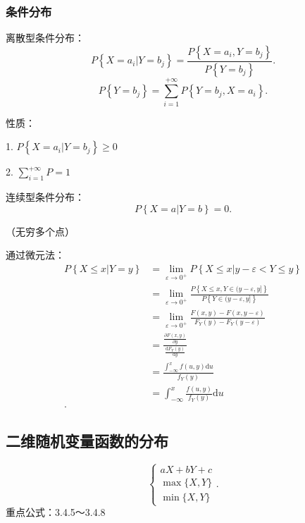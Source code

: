 \subsubsection{条件分布}%
\label{subsub:条件分布}
\begin{notation}
    离散型条件分布：
    \[
        P\left\{ X=a_i|Y=b_j \right\} =\frac{P\left\{ X=a_i,Y=b_j \right\} }{P\left\{ Y=b_j \right\} }
    .\] 
    \[
        P\left\{ Y=b_j \right\} =\sum_{i=1}^{+\infty} P\left\{ Y=b_j,X=a_i \right\} 
    .\] 

    性质：

    1. $P\left\{ X=a_i|Y=b_j \right\} \ge 0$

    2. $\displaystyle{\sum_{i=1}^{+\infty} P=1}$
\end{notation}
\begin{notation}
    连续型条件分布：
    \[
        P\left\{ X=a|Y=b \right\} =0
    .\] 

    （无穷多个点）

    通过微元法：
    \begin{align*}
        P\left\{ X\le x|Y=y \right\} &=\lim_{\varepsilon \to 0^{+}} P\left\{ X\le x|y-\varepsilon < Y \le y \right\} \\
                                     &= \lim_{\varepsilon \to 0^+} \frac{P\left\{ X\le x,Y\in (y-\varepsilon,y] \right\} }{P\left\{ Y\in (y-\varepsilon,y] \right\} } \\
                                     &= \lim_{\varepsilon \to 0^+} \frac{F\left( x,y \right) -F\left( x,y-\varepsilon \right) }{F_{Y}\left( y \right) -F_{Y}\left( y-\varepsilon \right) } \\
                                     &= \frac{\displaystyle{\frac{\partial F\left( x,y \right) }{\partial y} }}{\displaystyle{\frac{\mathrm{d}F_Y\left( y \right) }{\mathrm{d}y}}} \\
                                     &= \frac{\displaystyle{\int_{-\infty}^{x} f\left( u,y \right) \mathrm{d}u}}{f_{Y}\left( y \right) } \\
                                     &= \int_{-\infty}^{x} \frac{f\left( u,y \right) }{f_{Y}\left( y \right) } \mathrm{d}u \\
    .\end{align*}
\end{notation}
\subsection{二维随机变量函数的分布}%
\label{sub:二维随机变量函数的分布}
\[
    \begin{cases}
        aX+bY+c\\
        \max\{X,Y\}\\
        \min\{X,Y\}
    \end{cases}
.\] 
重点公式：3.4.5～3.4.8

